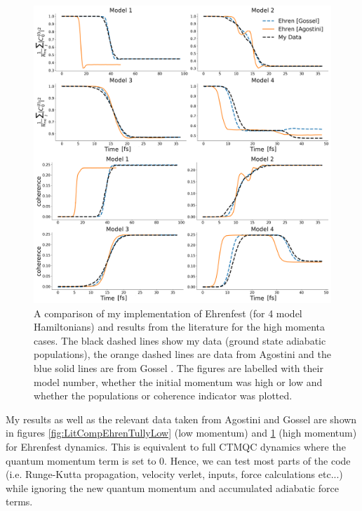 \begin{figure}[ht]
	\includegraphics[width=\textwidth]{../img/CTMQC/TullyModels/Ehren_highMom.png}
	\caption{\label{fig:LitCompEhrenTullyHigh}A comparison of my implementation of Ehrenfest (for 4 model Hamiltonians) and results from the literature for the high momenta cases. The black dashed lines show my data (ground state adiabatic populations), the orange dashed lines are data from Agostini \cite{agostini_quantum-classical_2016} and the blue solid lines are from Gossel \cite{gossel_coupled-trajectory_2018}. The figures are labelled with their model number, whether the initial momentum was high or low and whether the populations or coherence indicator was plotted.}
\end{figure}
\noindent My results as well as the relevant data taken from Agostini and Gossel \cite{agostini_quantum-classical_2016, gossel_coupled-trajectory_2018} are shown in figures \ref{fig:LitCompEhrenTullyLow} (low momentum) and \ref{fig:LitCompEhrenTullyHigh} (high momentum) for Ehrenfest dynamics. This is equivalent to full CTMQC dynamics where the quantum momentum term is set to 0. Hence, we can test most parts of the code (i.e. Runge-Kutta propagation, velocity verlet, inputs, force calculations etc...) while ignoring the new quantum momentum and accumulated adiabatic force terms.
\\\\
